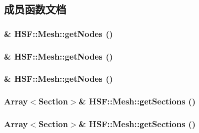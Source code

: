 \subsection{成员函数文档}
\hypertarget{classHSF_1_1Mesh_aef198f95314eb6938a1713b07337155f}{
\subsubsection[{getNodes}]{\& HSF::Mesh::getNodes ()}}
\label{classHSF_1_1Mesh_aef198f95314eb6938a1713b07337155f}
\hypertarget{classHSF_1_1Mesh_aef198f95314eb6938a1713b07337155f}{
\subsubsection[{getNodes}]{\& HSF::Mesh::getNodes ()}}
\label{classHSF_1_1Mesh_aef198f95314eb6938a1713b07337155f}
\hypertarget{classHSF_1_1Mesh_aef198f95314eb6938a1713b07337155f}{
\subsubsection[{getNodes}]{\& HSF::Mesh::getNodes ()}}
\label{classHSF_1_1Mesh_aef198f95314eb6938a1713b07337155f}
\hypertarget{classHSF_1_1Mesh_a4c3c5c8a8ccd5413c01c05592863a5ea}{
\subsubsection[{getSections}]{\setlength{\rightskip}{0pt plus 5cm}Array$<${\bf Section}$>$\& HSF::Mesh::getSections ()}}
\label{classHSF_1_1Mesh_a4c3c5c8a8ccd5413c01c05592863a5ea}
\hypertarget{classHSF_1_1Mesh_a4c3c5c8a8ccd5413c01c05592863a5ea}{
\subsubsection[{getSections}]{\setlength{\rightskip}{0pt plus 5cm}Array$<${\bf Section}$>$\& HSF::Mesh::getSections ()}}
